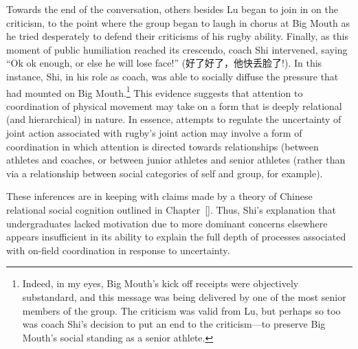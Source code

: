 \begin{CJK}{UTF8}{gbsn}
Towards the end of the conversation, others besides Lu began to join in on the criticism, to the point where the group began to laugh in chorus at Big Mouth as he tried desperately to defend their criticisms of his rugby ability.  Finally, as this moment of public humiliation reached its crescendo, coach Shi intervened, saying ``Ok ok enough, or else he will lose face!'' (好了好了，他快丢脸了!).  In this instance, Shi, in his role as coach, was able to socially diffuse the pressure that had mounted on Big Mouth.\footnote{Indeed, in my eyes, Big Mouth's kick off receipts were objectively substandard, and this message was being delivered by one of the most senior members of the group. The criticism was valid from Lu, but perhaps so too was coach Shi's decision to put an end to the criticism---to preserve Big Mouth's social standing as a senior athlete.}  This evidence suggests that attention to coordination of physical movement may take on a form that is deeply relational (and hierarchical) in nature.  In essence, attempts to regulate the uncertainty of joint action associated with rugby's joint action may involve a form of coordination in which attention is directed towards relationships (between athletes and coaches, or between junior athletes and senior athletes (rather than via a relationship between social categories of self and group, for example).

These inferences are in keeping with claims made by a theory of Chinese relational social cognition outlined in Chapter~\ref{}.  Thus, Shi's explanation that undergraduates lacked motivation due to more dominant concerns elsewhere appears insufficient in its ability to explain the full depth of processes associated with on-field coordination in response to uncertainty.





\end{CJK}
